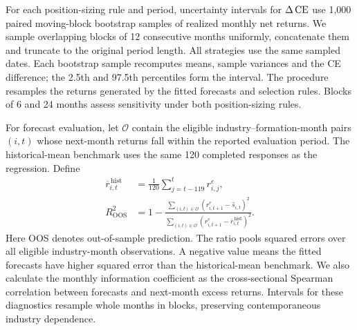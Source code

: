 For each position-sizing rule and period, uncertainty intervals for $\Delta\operatorname{CE}$ use 1,000 paired moving-block bootstrap samples of realized monthly net returns. We sample overlapping blocks of 12 consecutive months uniformly, concatenate them and truncate to the original period length. All strategies use the same sampled dates. Each bootstrap sample recomputes means, sample variances and the CE difference; the 2.5th and 97.5th percentiles form the interval. The procedure resamples the returns generated by the fitted forecasts and selection rules. Blocks of 6 and 24 months assess sensitivity under both position-sizing rules.

For forecast evaluation, let $\mathcal O$ contain the eligible industry--formation-month pairs $(i,t)$ whose next-month returns fall within the reported evaluation period. The historical-mean benchmark uses the same 120 completed responses as the regression. Define
\begin{equation}
\begin{aligned}
\overline r^{\,\mathrm{hist}}_{i,t}
&=\frac{1}{120}\sum_{j=t-119}^{t}r^e_{i,j},\\
R_{\mathrm{OOS}}^2
&=1-
\frac{\sum_{(i,t)\in\mathcal O}
\left(r^e_{i,t+1}-\widehat s_{i,t}\right)^2}
{\sum_{(i,t)\in\mathcal O}
\left(r^e_{i,t+1}-\overline r^{\,\mathrm{hist}}_{i,t}\right)^2}.
\end{aligned}
\label{eq:forecast-r2}
\end{equation}
Here OOS denotes out-of-sample prediction. The ratio pools squared errors over all eligible industry-month observations. A negative value means the fitted forecasts have higher squared error than the historical-mean benchmark. We also calculate the monthly information coefficient as the cross-sectional Spearman correlation between forecasts and next-month excess returns. Intervals for these diagnostics resample whole months in blocks, preserving contemporaneous industry dependence.

